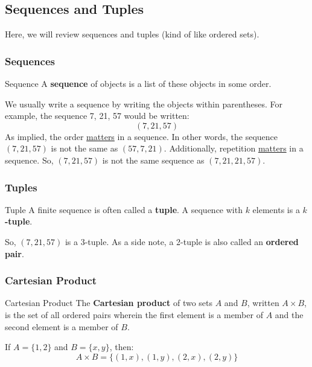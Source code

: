 \documentclass[letterpaper]{article}
\begin{document}
\subsection{Sequences and Tuples}
Here, we will review sequences and tuples (kind of like ordered sets).

\subsubsection{Sequences}
\begin{definition}{Sequence}{}
    A \textbf{sequence} of objects is a list of these objects in some order.
\end{definition}
We usually write a sequence by writing the objects within parentheses. For example, the sequence 7, 21, 57 would be written:
\[(7, 21, 57)\]
As implied, the order \underline{matters} in a sequence. In other words, the sequence $(7, 21, 57)$ is not the same as $(57, 7, 21)$. Additionally, repetition \underline{matters} in a sequence. So, $(7, 21, 57)$ is not the same sequence as $(7, 21, 21, 57)$. 

\subsubsection{Tuples}
\begin{definition}{Tuple}{}
    A finite sequence is often called a \textbf{tuple}. A sequence with $k$ elements is a \textbf{$k$-tuple}.
\end{definition}
So, $(7, 21, 57)$ is a 3-tuple. As a side note, a 2-tuple is also called an \textbf{ordered pair}.

\subsubsection{Cartesian Product}
\begin{definition}{Cartesian Product}{}
    The \textbf{Cartesian product} of two sets $A$ and $B$, written $A \times B$, is the set of all ordered pairs wherein the first element is a member of $A$ and the second element is a member of $B$. 
\end{definition}
If $A = \{1, 2\}$ and $B = \{x, y\}$, then:
\[A \times B = \{(1, x), (1, y), (2, x), (2, y)\}\]
\end{document}

